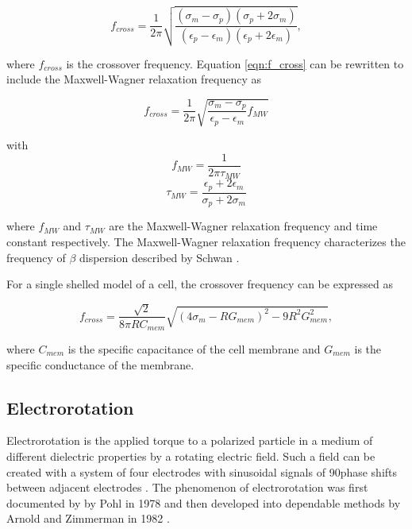  \begin{equation}
     f_{cross} = \frac{1}{2 \pi}\sqrt{\frac{(\sigma_m-\sigma_p)(\sigma_p+2\sigma_m)}{(\epsilon_p-\epsilon_m)(\epsilon_p+2\epsilon_m)}},
     \label{eqn:f_cross}
 \end{equation}
  
 \noindent where $f_{cross}$ is the crossover frequency. Equation \ref{eqn:f_cross} can be rewritten to include the Maxwell-Wagner relaxation frequency as \cite{morgan_single_2007}
 
 \begin{equation}
    f_{cross} = \frac{1}{2 \pi} \sqrt{\frac{\sigma_m - \sigma_p}{\epsilon_p - \epsilon_m}f_{MW}}
 \end{equation}
 
 \noindent with
\begin{equation}
    f_{MW} = \frac{1}{2\pi\tau_{MW}} 
\end{equation}
\begin{equation}
    \tau_{MW} = \frac{\epsilon_p + 2\epsilon_m}{\sigma_p + 2\sigma_m}
\end{equation}
 
 \noindent where $f_{MW}$ and $\tau_{MW}$ are the Maxwell-Wagner relaxation frequency and time constant respectively. The Maxwell-Wagner relaxation frequency characterizes the frequency of $\beta$ dispersion described by Schwan \cite{morgan_single_2007}.
 
 \par For a single shelled model of a cell, the crossover frequency can be expressed as
 
 \begin{equation}
     f_{cross} = \frac{\sqrt{2}}{8\pi R C_{mem}}\sqrt{(4\sigma_m - RG_{mem})^2 - 9R^2G^2_{mem}},
 \end{equation}
 
 \noindent where $C_{mem}$ is the specific capacitance of the cell membrane and $G_{mem}$ is the specific conductance of the membrane.
 
 \subsection{Electrorotation}
 
 \par Electrorotation is the applied torque to a polarized particle in a medium of different dielectric properties by a rotating electric field. Such a field can be created with a system of four electrodes with sinusoidal signals of 90\textdegree \;phase shifts between adjacent electrodes \cite{goater_electrorotation_1999}. The phenomenon of electrorotation was first documented by by Pohl in 1978 and then developed into dependable methods by Arnold and Zimmerman in 1982 \cite{pohl_dielectrophoresis_1978-1, arnold_rotating-field-induced_1982}.
 
